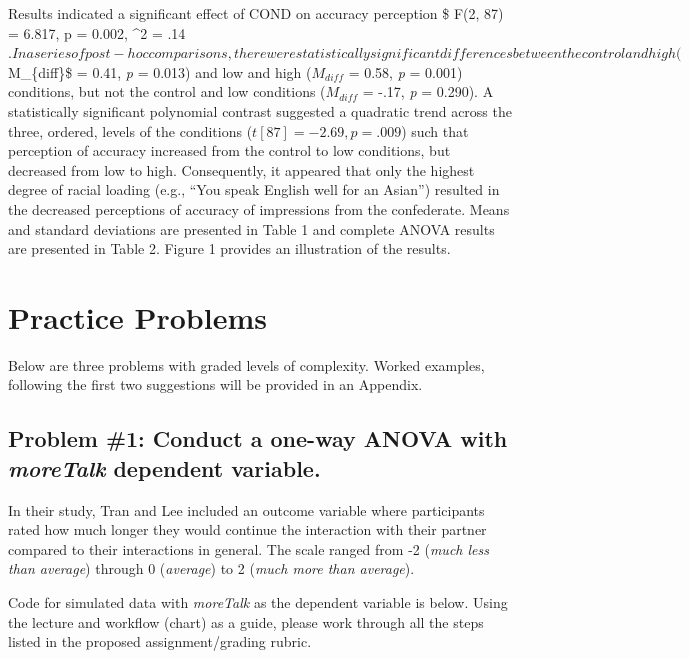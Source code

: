 \documentclass[
  english,
]{book}
\begin{document}
Results indicated a significant effect of COND on accuracy perception \$ F(2, 87) = 6.817, p = 0.002, \eta\^{}2 = .14\(. In a series of post-hoc comparisons, there were statistically significant differences between the control and high (\)M\_\{diff\}\$ = 0.41, \emph{p} = 0.013) and low and high (\(M_{diff}\) = 0.58, \emph{p} = 0.001) conditions, but not the control and low conditions (\(M_{diff}\) = -.17, \emph{p} = 0.290). A statistically significant polynomial contrast suggested a quadratic trend across the three, ordered, levels of the conditions (\(t[87] = -2.69, p = .009\)) such that perception of accuracy increased from the control to low conditions, but decreased from low to high. Consequently, it appeared that only the highest degree of racial loading (e.g., ``You speak English well for an Asian'') resulted in the decreased perceptions of accuracy of impressions from the confederate. Means and standard deviations are presented in Table 1 and complete ANOVA results are presented in Table 2. Figure 1 provides an illustration of the results.

\hypertarget{practice-problems}{%
\section{Practice Problems}\label{practice-problems}}

Below are three problems with graded levels of complexity. Worked examples, following the first two suggestions will be provided in an Appendix.

\hypertarget{problem-1-conduct-a-one-way-anova-with-moretalk-dependent-variable.}{%
\subsection{\texorpdfstring{Problem \#1: Conduct a one-way ANOVA with \emph{moreTalk} dependent variable.}{Problem \#1: Conduct a one-way ANOVA with moreTalk dependent variable.}}\label{problem-1-conduct-a-one-way-anova-with-moretalk-dependent-variable.}}

In their study, Tran and Lee \citeyearpar{tran_you_2014} included an outcome variable where participants rated how much longer they would continue the interaction with their partner compared to their interactions in general. The scale ranged from -2 (\emph{much less than average}) through 0 (\emph{average}) to 2 (\emph{much more than average}).

Code for simulated data with \emph{moreTalk} as the dependent variable is below. Using the lecture and workflow (chart) as a guide, please work through all the steps listed in the proposed assignment/grading rubric.
\end{document}

